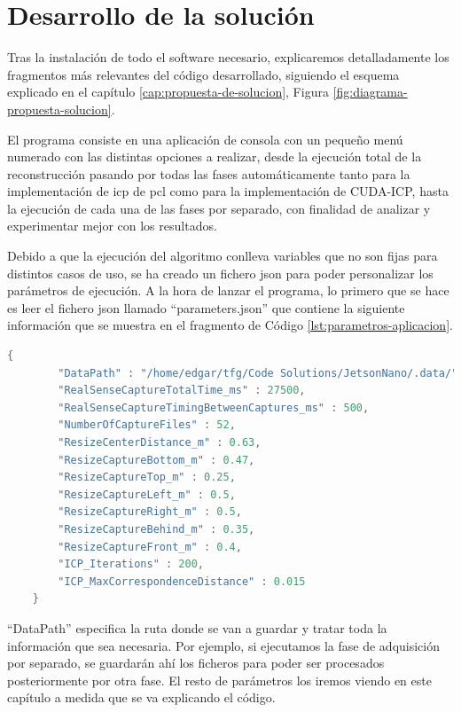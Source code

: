 \section{Desarrollo de la solución}

Tras la instalación de todo el software necesario, explicaremos detalladamente los fragmentos más relevantes del código desarrollado, siguiendo el esquema explicado en el capítulo \ref{cap:propuesta-de-solucion}, Figura \ref{fig:diagrama-propuesta-solucion}.

El programa consiste en una aplicación de consola con un pequeño menú numerado con las distintas opciones a realizar, desde la ejecución total de la reconstrucción pasando por todas las fases automáticamente tanto para la implementación de \gls{icp} de \gls{pcl} como para la implementación de CUDA-ICP, hasta la ejecución de cada una de las fases por separado, con finalidad de analizar y experimentar mejor con los resultados.

Debido a que la ejecución del algoritmo conlleva variables que no son fijas para distintos casos de uso, se ha creado un fichero json para poder personalizar los parámetros de ejecución.
A la hora de lanzar el programa, lo primero que se hace es leer el fichero json llamado ``parameters.json'' que contiene la siguiente información que se muestra en el fragmento de Código \ref{lst:parametros-aplicacion}.

\begin{lstlisting}[language={C++}, caption={Parámetros de la aplicación}, label={lst:parametros-aplicacion}]
    {
        "DataPath" : "/home/edgar/tfg/Code Solutions/JetsonNano/.data/",
        "RealSenseCaptureTotalTime_ms" : 27500,
        "RealSenseCaptureTimingBetweenCaptures_ms" : 500,
        "NumberOfCaptureFiles" : 52,
        "ResizeCenterDistance_m" : 0.63,
        "ResizeCaptureBottom_m" : 0.47,
        "ResizeCaptureTop_m" : 0.25,
        "ResizeCaptureLeft_m" : 0.5,
        "ResizeCaptureRight_m" : 0.5,
        "ResizeCaptureBehind_m" : 0.35,
        "ResizeCaptureFront_m" : 0.4,
        "ICP_Iterations" : 200,
        "ICP_MaxCorrespondenceDistance" : 0.015
    }
\end{lstlisting}

``DataPath'' especifica la ruta donde se van a guardar y tratar toda la información que sea necesaria.
Por ejemplo, si ejecutamos la fase de adquisición por separado, se guardarán ahí los ficheros para poder ser procesados posteriormente por otra fase.
El resto de parámetros los iremos viendo en este capítulo a medida que se va explicando el código.

